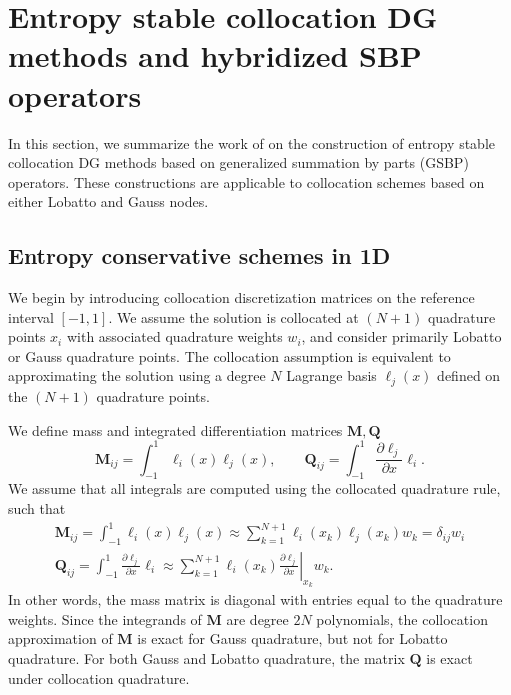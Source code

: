 \documentclass{svjour3}                     %
\newcommand{\pd}[2]{\frac{\partial#1}{\partial#2}}
\newcommand{\LRl}[1]{\left. #1 \right|}
\begin{document}
\section{Entropy stable collocation DG methods and hybridized SBP operators}
\label{sec:1}

In this section, we summarize the work of \cite{chan2018efficient} on the construction of entropy stable collocation DG methods based on generalized summation by parts (GSBP) operators.  These constructions are applicable to collocation schemes based on either Lobatto and Gauss nodes.  

\subsection{Entropy conservative schemes in 1D}

We begin by introducing collocation discretization matrices on the reference interval $[-1,1]$.  We assume the solution is collocated at $(N+1)$ quadrature points $x_i$ with associated quadrature weights $w_i$, and consider primarily Lobatto or Gauss quadrature points.  The collocation assumption is equivalent to approximating the solution using a degree $N$ Lagrange basis $\ell_j(x)$ defined on the $(N+1)$ quadrature points.  

We define mass and integrated differentiation matrices $\bm{M}, \bm{Q}$
\[
\bm{M}_{ij} = \int_{-1}^1 \ell_i(x)\ell_j(x), \qquad \bm{Q}_{ij} = \int_{-1}^1 \pd{\ell_j}{x}\ell_i.
\]
We assume that all integrals are computed using the collocated quadrature rule, such that 
\begin{gather*}
\bm{M}_{ij} = \int_{-1}^1 \ell_i(x)\ell_j(x) \approx \sum_{k=1}^{N+1} \ell_i(x_k)\ell_j(x_k) w_k = \delta_{ij} w_i\\
\bm{Q}_{ij} = \int_{-1}^1 \pd{\ell_j}{x}\ell_i \approx \sum_{k=1}^{N+1} \ell_i(x_k)\LRl{\pd{\ell_j}{x}}_{x_k} w_k.  
\end{gather*}
In other words, the mass matrix is diagonal with entries equal to the quadrature weights.  Since the integrands of $\bm{M}$ are degree $2N$ polynomials, the collocation approximation of $\bm{M}$ is exact for Gauss quadrature, but not for Lobatto quadrature.  For both Gauss and Lobatto quadrature, the matrix $\bm{Q}$ is exact under collocation quadrature.
\end{document}
